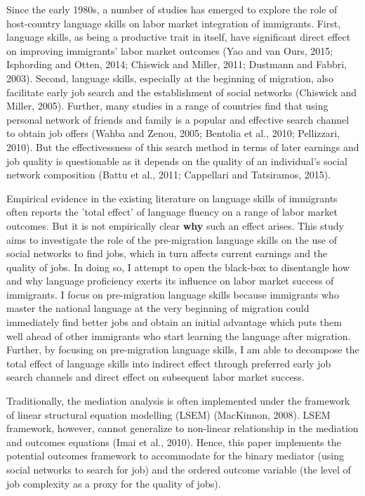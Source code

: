 \documentclass[12pt,a4paper]{article}
\begin{document}
Since the early 1980s, a number of studies has emerged to explore the role of host-country language skills on labor market integration of immigrants. First, language skills, as being a productive trait in itself, have significant direct effect on improving immigrants' labor market outcomes (Yao and van Ours, 2015; Isphording and Otten, 2014; Chiswick and Miller, 2011; Dustmann and Fabbri, 2003). Second, language skills, especially at the beginning of migration, also facilitate early job search and the establishment of social networks (Chiswick and Miller, 2005). Further, many studies in a range of countries find that using personal network of friends and family is a popular and effective search channel to obtain job offers (Wahba and Zenou, 2005; Bentolia et al., 2010; Pellizzari, 2010). But the effectivessness of this search method in terms of later earnings and job quality is questionable as it depends on the quality of an individual's social network composition (Battu et al., 2011; Cappellari and Tatsiramos, 2015).

Empirical evidence in the existing literature on language skills of immigrants often reports the 'total effect' of language fluency on a range of labor market outcomes. But it is not empirically clear \textbf{why} such an effect arises. This study aims to investigate the role of the pre-migration language skills on the use of social networks to find jobs, which in turn affects current earnings and the quality of jobs. In doing so, I attempt to open the black-box to disentangle how and why language proficiency exerts its influence on labor market success of immigrants. I focus on pre-migration language skills because immigrants who master the national language at the very beginning of migration could immediately find better jobs and obtain an initial advantage which puts them well ahead of other immigrants who start learning the language after migration. Further, by focusing on pre-migration language skills, I am able to decompose the total effect of language skills into indirect effect through preferred early job search channels and direct effect on subsequent labor market success.

Traditionally, the mediation analysis is often implemented under the framework of linear structural equation modelling (LSEM) (MacKinnon, 2008). LSEM framework, however, cannot generalize to non-linear relationship in the mediation and outcomes equations (Imai et al., 2010). Hence, this paper implements the potential outcomes framework to accommodate for the binary mediator (using social networks to search for job) and the ordered outcome variable (the level of job complexity as a proxy for the quality of jobs).
\end{document}

